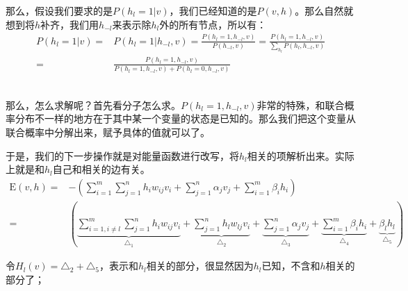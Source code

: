 \documentclass[a4paper]{article}
\begin{document}
那么，假设我们要求的是$P(h_l=1|v)$，我们已经知道的是$P(v,h)$。那么自然就想到将$h$补齐，我们用$h_{-l}$来表示除$h_l$外的所有节点，所以有：
\begin{equation*}
    \begin{split}
        P(h_l=1|v) = & P(h_l=1|h_{-l},v) = \frac{P(h_l=1,h_{-l},v)}{P(h_{-l},v)} = \frac{P(h_l=1,h_{-l},v)}{\sum_{h_l} P(h_l,h_{-l},v)} \\
        = & \frac{P(h_l=1,h_{-l},v)}{P(h_l=1,h_{-l},v)+P(h_l=0,h_{-l},v)}
    \end{split}
\end{equation*}

~\\

那么，怎么求解呢？首先看分子怎么求。$P(h_l=1,h_{-l},v)$非常的特殊，和联合概率分布不一样的地方在于其中某一个变量的状态是已知的。那么我们把这个变量从联合概率中分解出来，赋予具体的值就可以了。

于是，我们的下一步操作就是对能量函数进行改写，将$h_l$相关的项解析出来。实际上就是和$h_l$自己和相关的边有关。
\begin{equation}
\begin{split}
    \mathrm{E}(v,h)= & - \left( \sum_{i=1}^m \sum_{j=1}^n h_iw_{ij}v_i + \sum_{j=1}^n \alpha_j v_j + \sum_{i=1}^m \beta_i h_i \right)  \\
    = & \left( \underbrace{\sum_{i=1,i\neq l}^m \sum_{j=1}^n h_iw_{ij}v_i}_{\triangle_1} + \underbrace{\sum_{j=1}^n h_lw_{lj}v_i}_{\triangle_2} + \underbrace{\sum_{j=1}^n \alpha_j v_j}_{\triangle_3} + \underbrace{\sum_{i=1}^m \beta_i h_i}_{\triangle_4} +\underbrace{ \beta_l h_l }_{\triangle_5} \right)  
\end{split}
\end{equation}

令$H_l(v)=\triangle_2+\triangle_5$，表示和$h_l$相关的部分，很显然因为$h_l$已知，不含和$h$相关的部分了；
\end{document}
